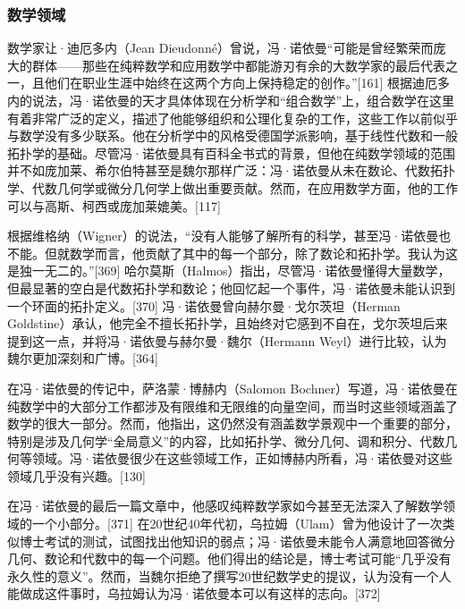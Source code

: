 \subsubsection{数学领域}  
数学家让·迪厄多内（Jean Dieudonné）曾说，冯·诺依曼“可能是曾经繁荣而庞大的群体——那些在纯粹数学和应用数学中都能游刃有余的大数学家的最后代表之一，且他们在职业生涯中始终在这两个方向上保持稳定的创作。”[161] 根据迪厄多内的说法，冯·诺依曼的天才具体体现在分析学和“组合数学”上，组合数学在这里有着非常广泛的定义，描述了他能够组织和公理化复杂的工作，这些工作以前似乎与数学没有多少联系。他在分析学中的风格受德国学派影响，基于线性代数和一般拓扑学的基础。尽管冯·诺依曼具有百科全书式的背景，但他在纯数学领域的范围并不如庞加莱、希尔伯特甚至是魏尔那样广泛：冯·诺依曼从未在数论、代数拓扑学、代数几何学或微分几何学上做出重要贡献。然而，在应用数学方面，他的工作可以与高斯、柯西或庞加莱媲美。[117]

根据维格纳（Wigner）的说法，“没有人能够了解所有的科学，甚至冯·诺依曼也不能。但就数学而言，他贡献了其中的每一个部分，除了数论和拓扑学。我认为这是独一无二的。”[369] 哈尔莫斯（Halmos）指出，尽管冯·诺依曼懂得大量数学，但最显著的空白是代数拓扑学和数论；他回忆起一个事件，冯·诺依曼未能认识到一个环面的拓扑定义。[370] 冯·诺依曼曾向赫尔曼·戈尔茨坦（Herman Goldstine）承认，他完全不擅长拓扑学，且始终对它感到不自在，戈尔茨坦后来提到这一点，并将冯·诺依曼与赫尔曼·魏尔（Hermann Weyl）进行比较，认为魏尔更加深刻和广博。[364]

在冯·诺依曼的传记中，萨洛蒙·博赫内（Salomon Bochner）写道，冯·诺依曼在纯数学中的大部分工作都涉及有限维和无限维的向量空间，而当时这些领域涵盖了数学的很大一部分。然而，他指出，这仍然没有涵盖数学景观中一个重要的部分，特别是涉及几何学“全局意义”的内容，比如拓扑学、微分几何、调和积分、代数几何等领域。冯·诺依曼很少在这些领域工作，正如博赫内所看，冯·诺依曼对这些领域几乎没有兴趣。[130]

在冯·诺依曼的最后一篇文章中，他感叹纯粹数学家如今甚至无法深入了解数学领域的一个小部分。[371] 在20世纪40年代初，乌拉姆（Ulam）曾为他设计了一次类似博士考试的测试，试图找出他知识的弱点；冯·诺依曼未能令人满意地回答微分几何、数论和代数中的每一个问题。他们得出的结论是，博士考试可能“几乎没有永久性的意义”。然而，当魏尔拒绝了撰写20世纪数学史的提议，认为没有一个人能做成这件事时，乌拉姆认为冯·诺依曼本可以有这样的志向。[372]
